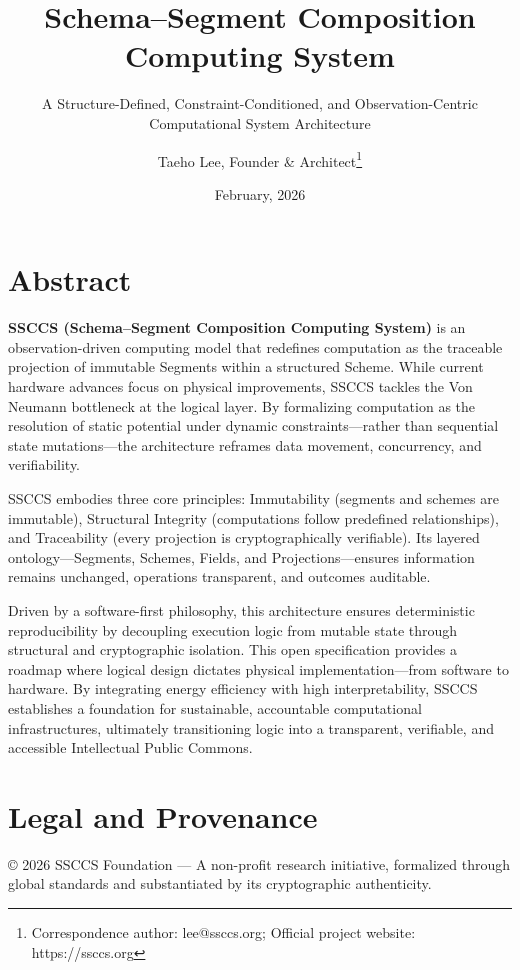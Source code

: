 \documentclass[
  a4paper,
  DIV=11,
  numbers=noendperiod]{scrartcl}
\author{Taeho Lee, Founder \& Architect\thanks{Correspondence author: lee@ssccs.org; Official project website: https://ssccs.org}}
\affil{SSCCS Foundation}
\title{Schema--Segment Composition Computing System}
\subtitle{A Structure-Defined, Constraint-Conditioned, and
Observation-Centric Computational System Architecture}
\author{}
\date{February, 2026}
\begin{document}
\maketitle


\section*{Abstract}\label{abstract}

\textbf{SSCCS (Schema--Segment Composition Computing System)} is an
observation-driven computing model that redefines computation as the
traceable projection of immutable Segments within a structured Scheme.
While current hardware advances focus on physical improvements, SSCCS
tackles the Von Neumann bottleneck at the logical layer. By formalizing
computation as the resolution of static potential under dynamic
constraints---rather than sequential state mutations---the architecture
reframes data movement, concurrency, and verifiability.

SSCCS embodies three core principles: Immutability (segments and schemes
are immutable), Structural Integrity (computations follow predefined
relationships), and Traceability (every projection is cryptographically
verifiable). Its layered ontology---Segments, Schemes, Fields, and
Projections---ensures information remains unchanged, operations
transparent, and outcomes auditable.

Driven by a software-first philosophy, this architecture ensures
deterministic reproducibility by decoupling execution logic from mutable
state through structural and cryptographic isolation. This open
specification provides a roadmap where logical design dictates physical
implementation---from software to hardware. By integrating energy
efficiency with high interpretability, SSCCS establishes a foundation
for sustainable, accountable computational infrastructures, ultimately
transitioning logic into a transparent, verifiable, and accessible
Intellectual Public Commons.

\newpage{}

\section*{Legal and Provenance}\label{legal-and-provenance}

© 2026 SSCCS Foundation --- A non-profit research initiative, formalized
through global standards and substantiated by its cryptographic
authenticity.
\end{document}
